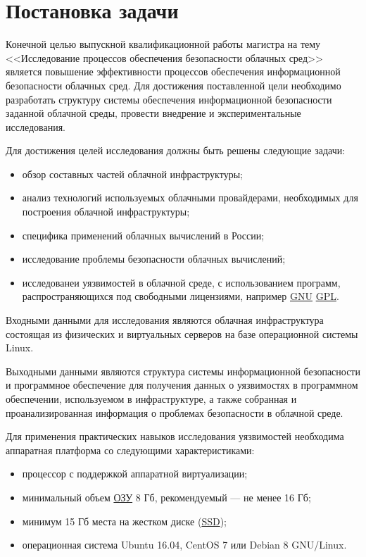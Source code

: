 \section{Постановка задачи}

Конечной целью выпускной квалификационной работы магистра на тему <<Исследование процессов обеспечения безопасности облачных сред>> является повышение эффективности процессов обеспечения информационной безопасности облачных сред.
Для достижения поставленной цели необходимо разработать структуру системы обеспечения информационной безопасности заданной облачной среды, провести внедрение и экспериментальные исследования.

Для достижения целей исследования должны быть решены следующие задачи:
\begin{itemize}
  \item обзор составных частей облачной инфраструктуры;
  \item анализ технологий используемых облачными провайдерами, необходимых для построения облачной инфраструктуры;
  \item специфика применений облачных вычислений в России;
  \item исследование проблемы безопасности облачных вычислений;
  \item исследованеи уязвимостей в облачной среде, с использованием программ, распространяющихся под свободными лицензиями, например \hyperlink{gnu}{GNU} \hyperlink{gpl}{GPL}.
\end{itemize}

Входными данными для исследования являются облачная инфраструктура состоящая из физических и виртуальных серверов на базе операционной системы Linux.

Выходными данными являются структура системы информационной безопасности и программное обеспечение для получения данных о уязвимостях в программном обеспечении, используемом в инфраструктуре, а также собранная и проанализированная информация о проблемах безопасности в облачной среде.

Для применения практических навыков исследования уязвимостей необходима аппаратная платформа со следующими характеристиками:
\begin{itemize}
  \item процессор с поддержкой аппаратной виртуализации;
  \item минимальный объем \hyperlink{ram}{ОЗУ} 8 Гб, рекомендуемый --- не менее 16 Гб;
  \item минимум 15 Гб места на жестком диске (\hyperlink{ssd}{SSD});
  \item операционная система Ubuntu 16.04, CentOS 7 или Debian 8 GNU/Linux.
\end{itemize}

